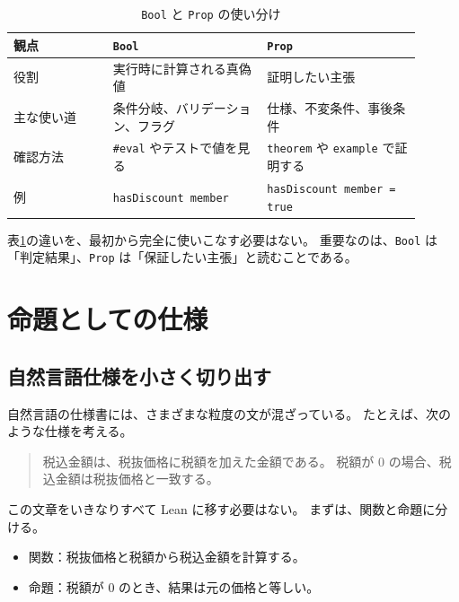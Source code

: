 \begin{table}[htbp]
\centering
\caption{\texttt{Bool} と \texttt{Prop} の使い分け}
\label{tab:ch02-bool-prop}
\begin{tabular}{p{0.22\linewidth}p{0.34\linewidth}p{0.34\linewidth}}
\toprule
観点 & \texttt{Bool} & \texttt{Prop} \\
\midrule
役割 & 実行時に計算される真偽値 & 証明したい主張 \\
主な使い道 & 条件分岐、バリデーション、フラグ & 仕様、不変条件、事後条件 \\
確認方法 & \texttt{\#eval} やテストで値を見る & \texttt{theorem} や \texttt{example} で証明する \\
例 & \texttt{hasDiscount member} & \texttt{hasDiscount member = true} \\
\bottomrule
\end{tabular}
\end{table}

表\ref{tab:ch02-bool-prop}の違いを、最初から完全に使いこなす必要はない。
重要なのは、\texttt{Bool} は「判定結果」、\texttt{Prop} は「保証したい主張」と読むことである。


\section{命題としての仕様}

\subsection{自然言語仕様を小さく切り出す}

自然言語の仕様書には、さまざまな粒度の文が混ざっている。
たとえば、次のような仕様を考える。

\begin{quote}
税込金額は、税抜価格に税額を加えた金額である。
税額が 0 の場合、税込金額は税抜価格と一致する。
\end{quote}

この文章をいきなりすべて Lean に移す必要はない。
まずは、関数と命題に分ける。

\begin{itemize}
\item 関数：税抜価格と税額から税込金額を計算する。
\item 命題：税額が 0 のとき、結果は元の価格と等しい。
\end{itemize}

